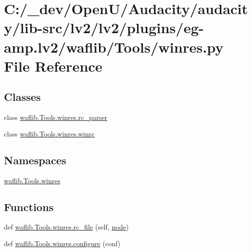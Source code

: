 \hypertarget{lv2_2plugins_2eg-amp_8lv2_2waflib_2_tools_2winres_8py}{}\section{C\+:/\+\_\+dev/\+Open\+U/\+Audacity/audacity/lib-\/src/lv2/lv2/plugins/eg-\/amp.lv2/waflib/\+Tools/winres.py File Reference}
\label{lv2_2plugins_2eg-amp_8lv2_2waflib_2_tools_2winres_8py}
\subsection*{Classes}
\begin{DoxyCompactItemize}
\item 
class \hyperlink{classwaflib_1_1_tools_1_1winres_1_1rc__parser}{waflib.\+Tools.\+winres.\+rc\+\_\+parser}
\item 
class \hyperlink{classwaflib_1_1_tools_1_1winres_1_1winrc}{waflib.\+Tools.\+winres.\+winrc}
\end{DoxyCompactItemize}
\subsection*{Namespaces}
\begin{DoxyCompactItemize}
\item 
 \hyperlink{namespacewaflib_1_1_tools_1_1winres}{waflib.\+Tools.\+winres}
\end{DoxyCompactItemize}
\subsection*{Functions}
\begin{DoxyCompactItemize}
\item 
def \hyperlink{namespacewaflib_1_1_tools_1_1winres_ac3e0ca77b048ed70a3403f4bbda55f9e}{waflib.\+Tools.\+winres.\+rc\+\_\+file} (self, \hyperlink{structnode}{node})
\item 
def \hyperlink{namespacewaflib_1_1_tools_1_1winres_a61d49dde1a942da70092bb59fe817f18}{waflib.\+Tools.\+winres.\+configure} (conf)
\end{DoxyCompactItemize}

